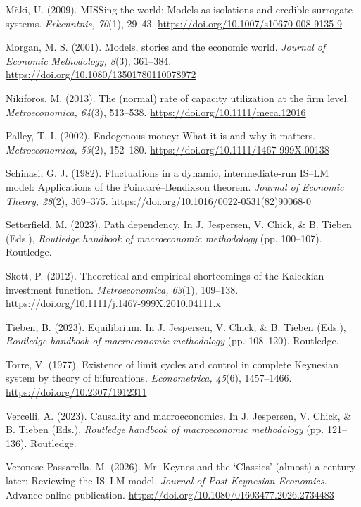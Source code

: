 \documentclass[10.5pt,twoside]{article}
\begin{document}
\begin{list}{}{
\setlength{\leftmargin}{1.5em}
\setlength{\itemindent}{-1.5em}
\setlength{\itemsep}{0.55em}
\setlength{\parsep}{0pt}}
\item Mäki, U. (2009). MISSing the world: Models as isolations and credible surrogate systems. \textit{Erkenntnis, 70}(1), 29--43. \url{https://doi.org/10.1007/s10670-008-9135-9}

\item Morgan, M. S. (2001). Models, stories and the economic world. \textit{Journal of Economic Methodology, 8}(3), 361--384. \url{https://doi.org/10.1080/13501780110078972}

\item Nikiforos, M. (2013). The (normal) rate of capacity utilization at the firm level. \textit{Metroeconomica, 64}(3), 513--538. \url{https://doi.org/10.1111/meca.12016}

\item Palley, T. I. (2002). Endogenous money: What it is and why it matters. \textit{Metroeconomica, 53}(2), 152--180. \url{https://doi.org/10.1111/1467-999X.00138}

\item Schinasi, G. J. (1982). Fluctuations in a dynamic, intermediate-run IS--LM model: Applications of the Poincaré--Bendixson theorem. \textit{Journal of Economic Theory, 28}(2), 369--375. \url{https://doi.org/10.1016/0022-0531(82)90068-0}

\item Setterfield, M. (2023). Path dependency. In J. Jespersen, V. Chick, \& B. Tieben (Eds.), \textit{Routledge handbook of macroeconomic methodology} (pp. 100--107). Routledge.

\item Skott, P. (2012). Theoretical and empirical shortcomings of the Kaleckian investment function. \textit{Metroeconomica, 63}(1), 109--138. \url{https://doi.org/10.1111/j.1467-999X.2010.04111.x}

\item Tieben, B. (2023). Equilibrium. In J. Jespersen, V. Chick, \& B. Tieben (Eds.), \textit{Routledge handbook of macroeconomic methodology} (pp. 108--120). Routledge.

\item Torre, V. (1977). Existence of limit cycles and control in complete Keynesian system by theory of bifurcations. \textit{Econometrica, 45}(6), 1457--1466. \url{https://doi.org/10.2307/1912311}

\item Vercelli, A. (2023). Causality and macroeconomics. In J. Jespersen, V. Chick, \& B. Tieben (Eds.), \textit{Routledge handbook of macroeconomic methodology} (pp. 121--136). Routledge.

\item Veronese Passarella, M. (2026). Mr. Keynes and the `Classics' (almost) a century later: Reviewing the IS--LM model. \textit{Journal of Post Keynesian Economics}. Advance online publication. \url{https://doi.org/10.1080/01603477.2026.2734483}

\end{list}
\endgroup
\end{document}
